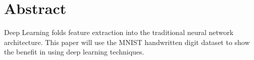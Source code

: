\chapter*{Abstract}
Deep Learning folds feature extraction into the traditional neural network architecture. This paper will use the MNIST handwritten digit dataset to show the benefit in using deep learning techniques. 